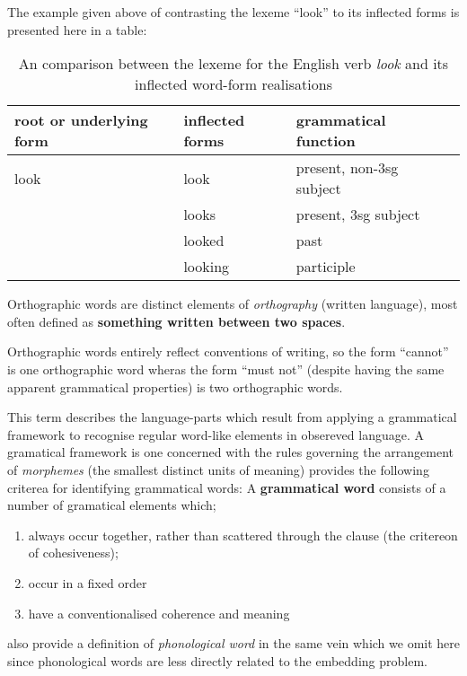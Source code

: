 \begin{example}\label{ex:lexemes}
  The example given above of contrasting the lexeme ``look'' to its inflected forms is presented here in a table:
  \begin{table}[H]
    \centering
    \begin{tabular}{l l l l}
      \toprule
      root or underlying form & inflected forms & grammatical function\\
      \midrule
      look                    & look            & present, non-3sg subject\\
                              & looks           & present, 3sg subject\\
                              & looked          & past\\
                              & looking         & participle\\
      \bottomrule
    \end{tabular}
    \caption{An comparison between the lexeme for the English verb \emph{look} and its inflected word-form realisations}
  \end{table}
\end{example}
\vspace{1em}
\begin{definition}
  Orthographic words are distinct elements of \emph{orthography} (written language), most often defined as \textbf{something written between two spaces}.
\end{definition}
\begin{example}\label{ex:orthographic-words}
  Orthographic words entirely reflect conventions of writing, so the form ``cannot'' is one orthographic word wheras the form ``must not'' (despite having the same apparent grammatical properties) is two orthographic words.
\end{example}
\begin{definition}
  This term describes the language-parts which result from applying a grammatical framework to recognise regular word-like elements in obsereved language. A gramatical framework is one concerned with the rules governing the arrangement of \emph{morphemes} (the smallest distinct units of meaning)
  \textcite{dixon02-word} provides the following criterea for identifying grammatical words:
  A \textbf{grammatical word} consists of a number of gramatical elements which;
  \begin{enumerate}[label=(\alph*)]
  \item always occur together, rather than scattered through the clause (the critereon of cohesiveness);
  \item occur in a fixed order
  \item have a conventionalised coherence and meaning
  \end{enumerate}
  \citeauthor{dixon02-word} also provide a definition of \emph{phonological word} in the same vein which we omit here since phonological words are less directly related to the embedding problem\footnotemark.
\end{definition}
